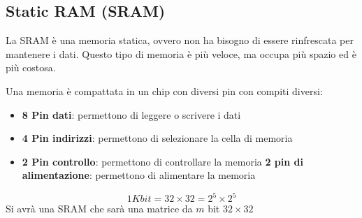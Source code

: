 \documentclass[a4paper]{article}
\theoremstyle{break}
\theoremstyle{break}
\theoremstyle{break}
\theoremstyle{break}
\begin{document}
\subsection{Static RAM (SRAM)}
La SRAM è una memoria statica, ovvero non ha bisogno di essere rinfrescata
per mantenere i dati. Questo tipo di memoria è più veloce, ma occupa più spazio
ed è più costosa.

Una memoria è compattata in un chip con diversi pin con compiti diversi:
\begin{itemize}
	\item \textbf{8 Pin dati}: permettono di leggere o scrivere i dati
	\item \textbf{4 Pin indirizzi}: permettono di selezionare la cella di memoria
	\item \textbf{2 Pin controllo}: permettono di controllare la memoria
	      \textbf{2 pin di alimentazione}: permettono di alimentare la memoria
\end{itemize}

\[
	1Kbit = 32 \times 32 = 2^5 \times 2^5
\]
Si avrà una SRAM che sarà una matrice da \( m \) bit \( 32 \times 32 \)
\end{document}
